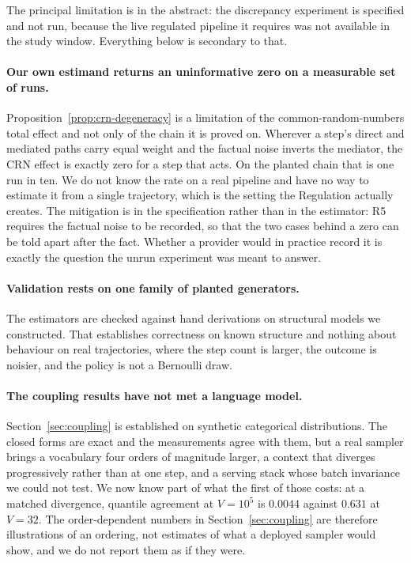\documentclass[11pt]{article}
\theoremstyle{remark}
\begin{document}
The principal limitation is in the abstract: the discrepancy experiment is
specified and not run, because the live regulated pipeline it requires was not
available in the study window. Everything below is secondary to that.

\paragraph{Our own estimand returns an uninformative zero on a measurable set of
runs.} Proposition~\ref{prop:crn-degeneracy} is a limitation of the
common-random-numbers total effect and not only of the chain it is proved on.
Wherever a step's direct and mediated paths carry equal weight and the factual
noise inverts the mediator, the CRN effect is exactly zero for a step that acts.
On the planted chain that is one run in ten. We do not know the rate on a real
pipeline and have no way to estimate it from a single trajectory, which is the
setting the Regulation actually creates. The mitigation is in the specification
rather than in the estimator: R5 requires the factual noise to be recorded, so
that the two cases behind a zero can be told apart after the fact. Whether a
provider would in practice record it is exactly the question the unrun
experiment was meant to answer.

\paragraph{Validation rests on one family of planted generators.} The estimators
are checked against hand derivations on structural models we constructed. That
establishes correctness on known structure and nothing about behaviour on real
trajectories, where the step count is larger, the outcome is noisier, and the
policy is not a Bernoulli draw.

\paragraph{The coupling results have not met a language model.} Section~\ref{sec:coupling}
is established on synthetic categorical distributions. The closed forms are exact
and the measurements agree with them, but a real sampler brings a vocabulary four
orders of magnitude larger, a context that diverges progressively rather than at
one step, and a serving stack whose batch invariance we could not test. We now
know part of what the first of those costs: at a matched divergence, quantile
agreement at $V = 10^5$ is $0.0044$ against $0.631$ at $V = 32$. The
order-dependent numbers in Section~\ref{sec:coupling} are therefore illustrations
of an ordering, not estimates of what a deployed sampler would show, and we do
not report them as if they were.
\end{document}
